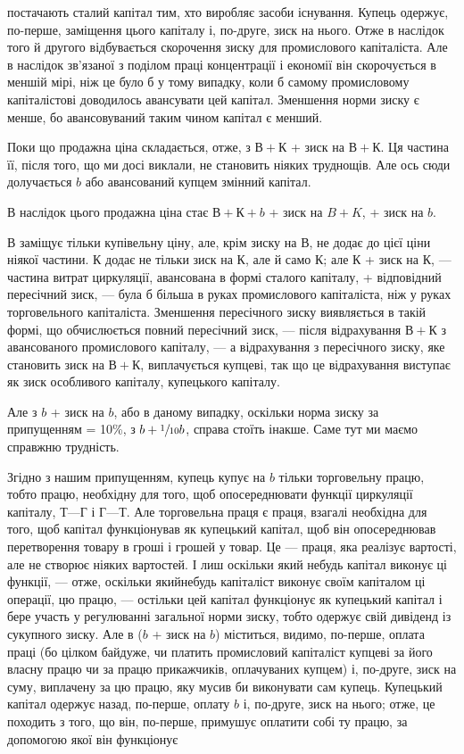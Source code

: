 \parcont{}  %
постачають сталий капітал тим, хто виробляє засоби існування.
Купець одержує, по-перше, заміщення цього капіталу і, по-друге,
зиск на нього. Отже в наслідок того й другого відбувається
скорочення зиску для промислового капіталіста. Але в наслідок
зв’язаної з поділом праці концентрації і економії він скорочується
в меншій мірі, ніж це було б у тому випадку, коли б самому
промисловому капіталістові доводилось авансувати цей капітал.
Зменшення норми зиску є менше, бо авансовуваний таким чином
капітал є менший.

Поки що продажна ціна складається, отже, з $В + К$ + зиск на
$В + К$. Ця частина її, після того, що ми досі виклали, не становить
ніяких труднощів. Але ось сюди долучається $b$ або авансований
купцем змінний капітал.

В наслідок цього продажна ціна стає $В + К + b$ + зиск на
$B + K$, + зиск на $b$.

$В$ заміщує тільки купівельну ціну, але, крім зиску на $В$, не
додає до цієї ціни ніякої частини. $К$ додає не тільки зиск на $К$,
але й само $К$; але $К$ + зиск на $К$, — частина витрат циркуляції,
авансована в формі сталого капіталу, + відповідний пересічний
зиск, — була б більша в руках промислового капіталіста, ніж у
руках торговельного капіталіста. Зменшення пересічного зиску
виявляється в такій формі, що обчислюється повний пересічний
зиск, — після відрахування $В + К$ з авансованого промислового
капіталу, — а відрахування з пересічного зиску, яке становить
зиск на $В + К$, виплачується купцеві, так що це відрахування
виступає як зиск особливого капіталу, купецького капіталу.

Але з $b$ + зиск на $b$, або в даному випадку, оскільки норма
зиску за припущенням = 10\%, з $b + \sfrac{1}{10}b$, справа стоїть інакше.
Саме тут ми маємо справжню трудність.

Згідно з нашим припущенням, купець купує на $b$ тільки торговельну
працю, тобто працю, необхідну для того, щоб опосереднювати
функції циркуляції капіталу, $Т — Г$ і $Г — Т$. Але торговельна
праця є праця, взагалі необхідна для того, щоб капітал
функціонував як купецький капітал, щоб він опосереднював перетворення
товару в гроші і грошей у товар. Це — праця, яка реалізує
вартості, але не створює ніяких вартостей. І лиш оскільки
який небудь капітал виконує ці функції, — отже, оскільки якийнебудь
капіталіст виконує своїм капіталом ці операції, цю працю,
— остільки цей капітал функціонує як купецький капітал
і бере участь у регулюванні загальної норми зиску, тобто одержує
свій дивіденд із сукупного зиску. Але в ($b$ + зиск на $b$) міститься,
видимо, по-перше, оплата праці (бо цілком байдуже, чи платить
промисловий капіталіст купцеві за його власну працю чи за працю
прикажчиків, оплачуваних купцем) і, по-друге, зиск на суму,
виплачену за цю працю, яку мусив би виконувати сам купець.
Купецький капітал одержує назад, по-перше, оплату $b$ і, по-друге,
зиск на нього; отже, це походить з того, що він, по-перше, примушує
оплатити собі ту працю, за допомогою якої він функціонує
\parbreak{}  %

